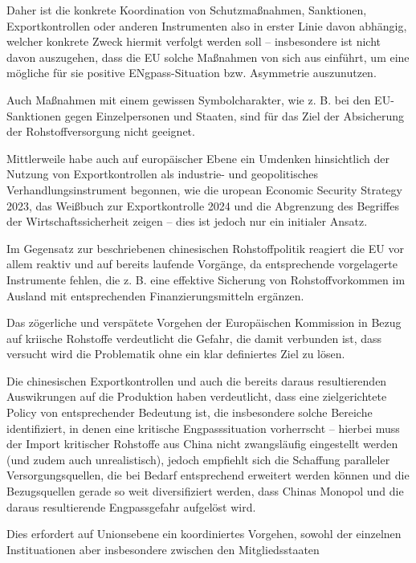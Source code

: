 \documentclass[12pt,a4paper,oneside]{book} %
\begin{document}
Daher ist die konkrete Koordination von Schutzmaßnahmen, Sanktionen, Exportkontrollen oder anderen Instrumenten also in erster Linie davon abhängig, welcher konkrete Zweck hiermit verfolgt werden soll -- insbesondere ist nicht davon auszugehen, dass die EU solche Maßnahmen von sich aus einführt, um eine mögliche für sie positive ENgpass-Situation bzw. Asymmetrie auszunutzen. 

Auch Maßnahmen mit einem gewissen Symbolcharakter, wie z. B. bei den EU-Sanktionen gegen Einzelpersonen und Staaten,\autocite{Leander LeendersEU Sanctions: A Relevant Foreign Policy Tool?} sind für das Ziel der Absicherung der Rohstoffversorgung nicht geeignet.

Mittlerweile habe auch auf europäischer Ebene ein Umdenken hinsichtlich der Nutzung von Exportkontrollen als industrie- und geopolitisches Verhandlungsinstrument begonnen, wie die uropean Economic Security Strategy 2023, das Weißbuch zur Exportkontrolle 2024 und die Abgrenzung des Begriffes der Wirtschaftssicherheit zeigen -- dies ist jedoch nur ein initialer Ansatz.

Im Gegensatz zur beschriebenen chinesischen Rohstoffpolitik reagiert die EU vor allem reaktiv und auf bereits laufende Vorgänge, da entsprechende vorgelagerte Instrumente fehlen, die z. B. eine effektive Sicherung von Rohstoffvorkommen im Ausland mit entsprechenden Finanzierungsmitteln ergänzen.

Das zögerliche und verspätete Vorgehen der Europäischen Kommission in Bezug auf kriische Rohstoffe verdeutlicht die Gefahr, die damit verbunden ist, dass versucht wird die Problematik ohne ein klar definiertes Ziel zu lösen.

Die chinesischen Exportkontrollen und auch die bereits daraus resultierenden Auswikrungen auf die Produktion haben verdeutlicht, dass eine zielgerichtete Policy von entsprechender Bedeutung ist, die insbesondere solche Bereiche identifiziert, in denen eine kritische Engpasssituation vorherrscht -- hierbei muss der Import kritischer Rohstoffe aus China nicht zwangsläufig eingestellt werden (und zudem auch unrealistisch), jedoch empfiehlt sich die Schaffung paralleler Versorgungsquellen, die bei Bedarf entsprechend erweitert werden können und die Bezugsquellen gerade so weit diversifiziert werden, dass Chinas Monopol und die daraus resultierende Engpassgefahr aufgelöst wird.\autocite[in Anlehnung an]{Fishman}

Dies erfordert auf Unionsebene ein koordiniertes Vorgehen, sowohl der einzelnen Instituationen aber insbesondere zwischen den Mitgliedsstaaten
\end{document}

